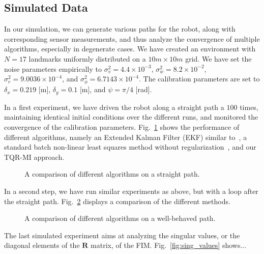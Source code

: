 \subsection{Simulated Data}

In our simulation, we can generate various paths for the robot, along with
corresponding sensor measurements, and thus analyze the convergence of multiple
algorithms, especially in degenerate cases. We have created an environment
with $N=17$ landmarks uniformly distributed on a $10m\times 10m$ grid. We have
set the noise parameters empirically to $\sigma^2_v=4.4\times 10^{-3}$,
$\sigma^2_w=8.2\times 10^{-2}$, $\sigma^2_r=9.0036\times 10^{-4}$, and
$\sigma^2_\phi=6.7143\times 10^{-4}$. The calibration parameters are set to
$\delta_x=0.219$ [m], $\delta_y=0.1$ [m], and $\psi=\pi/4$ [rad].

In a first experiment, we have driven the robot along a straight path a $100$
times, maintaining identical initial conditions over the different runs, and
monitored the convergence of the calibration parameters.
Fig.~\ref{fig:straight_comp} shows the performance of different algorithms,
namely an Extended Kalman Filter (EKF) similar to~\cite{martinelli06automatic},
a standard batch non-linear least squares method without
regularization~\cite{kuemmerle11simultaneous}, and our TQR-MI approach.


\begin{figure}[t]
\centering
{}
\caption{A comparison of different algorithms on a straight path.}
\label{fig:straight_comp}
\end{figure}

In a second step, we have run similar experiments as above, but with a loop
after the straight path. Fig.~\ref{fig:loop_comp} displays a comparison of the
different methods.


\begin{figure}[t]
\centering
{}
\caption{A comparison of different algorithms on a well-behaved path.}
\label{fig:loop_comp}
\end{figure}

The last simulated experiment aims at analyzing the singular values, or the
diagonal elements of the $\mathbf{R}$ matrix, of the FIM.
Fig.~\ref{fig:sing_values} shows...

